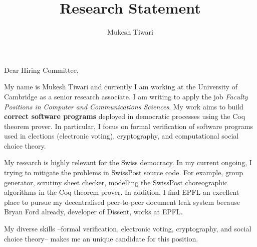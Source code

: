 \documentclass[a4paper]{article}
\title{Research Statement}
\author{Mukesh Tiwari}
\date{}
\begin{document}
\fontsize{12}{15}
\selectfont
\maketitle

Dear Hiring Committee, 

My name is Mukesh Tiwari and currently I am working at the University of Cambridge as 
a senior research associate. I am writing to apply the job 
\textit{Faculty Positions in Computer and Communications 
Sciences}. My work aims to build \textbf{correct software programs} deployed in democratic processes 
using the Coq theorem prover. In particular, I focus on formal verification of 
software programs used in elections (electronic voting), cryptography, and computational social choice theory. 


My research is highly relevant for the Swiss democracy. In my current ongoing, I trying to 
mitigate the problems in SwissPost source code. For example, group generator, scrutiny sheet checker, 
modelling the SwissPost choreographic algorithms in the Coq theorem prover. In addition, 
I find EPFL an excellent place to pursue my decentralised peer-to-peer document leak 
system because Bryan Ford already, developer of Dissent, works at EPFL. 



My diverse skills --formal verification, electronic voting, cryptography, 
and social choice theory-- makes me an unique candidate for this position.  
\end{document}
